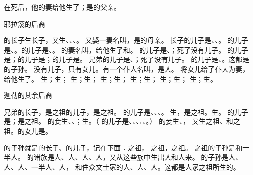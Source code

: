 {在{}死后，他的妻{}给他生了{}；{}是{}的父亲。
\par }{\SH 耶拉篾的后裔
\par }{\PP {}的长子{}生长子{}，又生{}、{}、{}、{}。
又娶一妻名叫{}，是{}的母亲。
长子{}的儿子是{}、{}、{}。
的儿子是{}、{}。{}的儿子是{}、{}。
的妻名叫{}，{}给他生了{}和{}。
的儿子是{}、{}；{}死了没有儿子。
的儿子是{}；{}的儿子是{}；{}的儿子是{}。
兄弟{}的儿子是{}、{}；{}死了没有儿子。
的儿子是{}、{}。这都是{}的子孙。
没有儿子，只有女儿。{}有一个仆人名叫{}，是{}人。
将女儿给了仆人{}为妻，给他生了{}。
生{}；{}生{}；
生{}；{}生{}；
生{}；{}生{}；
生{}；{}生{}；
生{}；{}生{}；
生{}；{}生{}。
\par }{\SH 迦勒的其余后裔
\par }{\PP {}兄弟{}的长子{}，是{}之祖{}的儿子，是{}之祖。
的儿子是{}、{}、{}、{}。
生{}，是{}之祖。{}生{}。
的儿子是{}；{}是{}之祖。
的妾{}生{}、{}、{}；{}生{}。（
的儿子是{}、{}、{}、{}、{}、{}。）
的妾{}生{}、{}，
又生{}之祖{}、{}和{}之祖{}。{}的女儿是{}。
\par }{\PP {}的子孙就是{}的长子、{}的儿子，记在下面：{}之祖{}，
之祖{}，{}之祖{}。
之祖{}的子孙是{}和一半{}人。
的诸族是{}人、{}人、{}人、{}人，又从这些族中生出{}人和{}人来。
的子孙是{}人、{}人、{}人、一半{}人、{}人，
和住{}众文士家的{}人、{}人、{}人。这都是{}人{}家之祖{}所生的。

}
